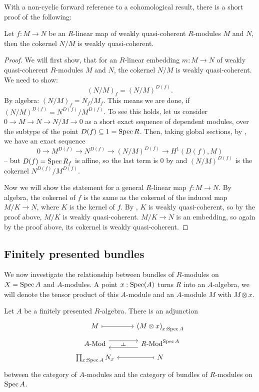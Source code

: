 With a non-cyclic forward reference to a cohomological result,
there is a short proof of the following:

\begin{proposition}\label{cokernel}%
  Let $f:M\to N$ be an $R$-linear map of weakly quasi-coherent $R$-modules $M$ and $N$,
  then the cokernel $N/M$ is weakly quasi-coherent.
\end{proposition}

\begin{proof}
  We will first show, that for an $R$-linear embedding $m:M\to N$
  of weakly quasi-coherent $R$-modules $M$ and $N$,
  the cokernel $N/M$ is weakly quasi-coherent.
  We need to show:
  \[
    (N/M)_f=(N/M)^{D(f)}.
  \]
  By algebra: $(N/M)_f=N_f/M_f$.
  This means we are done, if $(N/M)^{D(f)}=N^{D(f)}/{M^{D(f)}}$.
  To see this holds, let us consider $0\to M\to N\to N/M\to 0$ as a short exact sequence of dependent modules,
  over the subtype of the point $D(f)\subseteq 1=\operatorname{Spec} R$.
  Then, taking global sections, by ,
  we have an exact sequence
  \[
    0\to M^{D(f)}\to N^{D(f)}\to (N/M)^{D(f)}\to H^1(D(f),M)
  \]
  -- but $D(f)=\operatorname{Spec} R_f$ is affine,
  so the last term is 0 by 
  and $(N/M)^{D(f)}$ is the cokernel $N^{D(f)}/M^{D(f)}$.

  Now we will show the statement for a general $R$-linear map $f:M\to N$.
  By algebra, the cokernel of $f$ is the same as the cokernel of the induced map
  $M/K\to N$, where $K$ is the kernel of $f$.
  By , $K$ is weakly quasi-coherent, so by the proof above,
  $M/K$ is weakly quasi-coherent.
  $M/K\to N$ is an embedding, so again by the proof above, its cokernel is weakly quasi-coherent.
\end{proof}

\subsection{Finitely presented bundles}

We now investigate the relationship between bundles of $R$-modules on $X = \operatorname{Spec} A$
and $A$-modules.
A point $x:\operatorname{Spec}(A)$ turns $R$ into an $A$-algebra, we will denote the tensor product of this $A$-module and an $A$-module $M$
with $M\otimes x$.

\begin{proposition}
  Let $A$ be a finitely presented $R$-algebra.
  There is an adjunction
  \[ \begin{tikzcd}[row sep=tiny]
    M \ar[r, mapsto] & {(M \otimes x)}_{x : \Spec A} \\
    \Mod{A} \ar[r, shift left=2] \ar[r, phantom, "\rotatebox{90}{$\vdash$}"] &
    \Mod{R}^{\Spec A} \ar[l, shift left=2] \\
    \prod_{x : \Spec A} N_x & N \ar[l, mapsto]
  \end{tikzcd} \]
  between the category of $A$-modules
  and the category of bundles of $R$-modules on $\operatorname{Spec} A$.
\end{proposition}

